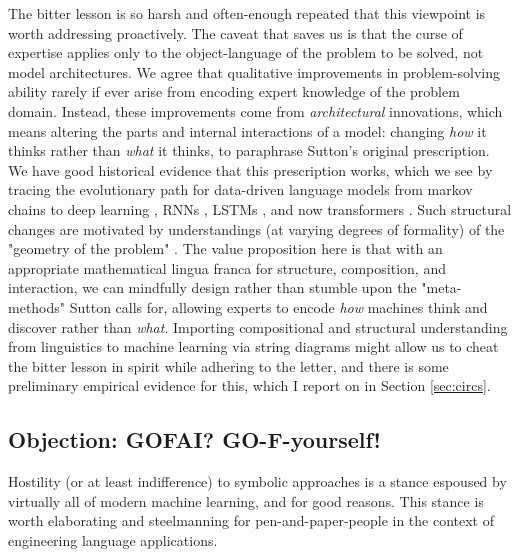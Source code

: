 The bitter lesson is so harsh and often-enough repeated that this viewpoint is worth addressing proactively. The caveat that saves us is that the curse of expertise applies only to the object-language of the problem to be solved, not model architectures. We agree that qualitative improvements in problem-solving ability rarely if ever arise from encoding expert knowledge of the problem domain. Instead, these improvements come from \emph{architectural} innovations, which means altering the parts and internal interactions of a model: changing \emph{how} it thinks rather than \emph{what} it thinks, to paraphrase Sutton's original prescription. We have good historical evidence that this prescription works, which we see by tracing the evolutionary path for data-driven language models from markov chains to deep learning \citep{lecun_deep_2015}, RNNs \citep{rumelhart_learning_1987}, LSTMs \citep{hochreiter_long_1997}, and now transformers \citep{vaswani_attention_2017}. Such structural changes are motivated by understandings (at varying degrees of formality) of the "geometry of the problem" \citep{bronstein_geometric_2021}. The value proposition here is that with an appropriate mathematical lingua franca for structure, composition, and interaction, we can mindfully design rather than stumble upon the "meta-methods" Sutton calls for, allowing experts to encode \emph{how} machines think and discover rather than \emph{what}. Importing compositional and structural understanding from linguistics to machine learning via string diagrams might allow us to cheat the bitter lesson in spirit while adhering to the letter, and there is some preliminary empirical evidence for this, which I report on in Section \ref{sec:circs}.

\subsection{\textbf{Objection:} GOFAI? GO-F-yourself!}
 
Hostility (or at least indifference) to symbolic approaches is a stance espoused by virtually all of modern machine learning, and for good reasons. This stance is worth elaborating and steelmanning for pen-and-paper-people in the context of engineering language applications.\\

